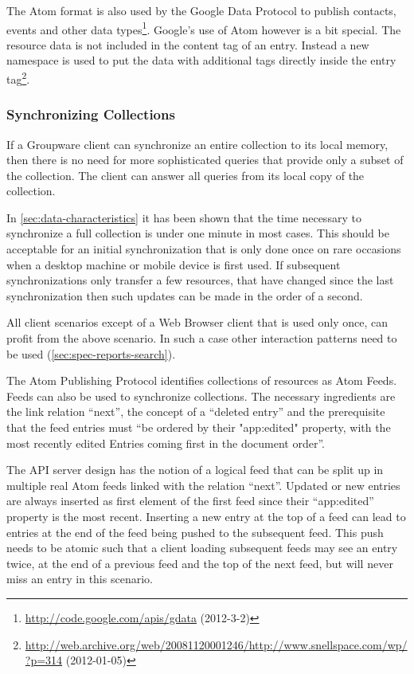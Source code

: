 \documentclass[12pt,a4paper]{scrartcl}		%
\newcommand{\citeurl}[2]{\url{#1} (#2)}
\begin{document}
The Atom format is also used by the Google Data Protocol to publish contacts,
events and other data
types\footnote{\citeurl{http://code.google.com/apis/gdata}{2012-3-2}}. Google's
use of Atom however is a bit special. The resource data is not included in the
content tag of an entry. Instead a new namespace is used to put the data with
additional tags directly inside the entry
tag\footnote{\citeurl{http://web.archive.org/web/20081120001246/http://www.snellspace.com/wp/?p=314}{2012-01-05}}.


\subsubsection{Synchronizing Collections}

If a Groupware client can synchronize an entire collection to its local memory,
then there is no need for more sophisticated queries that provide only a subset
of the collection. The client can answer all queries from its local copy of the
collection.

In \autoref{sec:data-characteristics} it has been shown that the time necessary
to synchronize a full collection is under one minute in most cases. This should
be acceptable for an initial synchronization that is only done once on rare
occasions when a desktop machine or mobile device is first used. If subsequent
synchronizations only transfer a few resources, that have changed since the last
synchronization then such updates can be made in the order of a second.

All client scenarios except of a Web Browser client that is used only once, can
profit from the above scenario. In such a case other interaction patterns need
to be used (\autoref{sec:spec-reports-search}).

The Atom Publishing Protocol identifies collections of resources as Atom
Feeds. Feeds can also be used to synchronize collections. The necessary
ingredients are the link relation ``next''\cite{RFC5005}, the concept of a
``deleted entry''\cite{draft-snell-atompub-tombstones-14} and the prerequisite
that the feed entries must ``be ordered by their "app:edited" property, with the
most recently edited Entries coming first in the document
order''\cite[sec. 10]{RFC5023}.

The API server design has the notion of a logical feed that can be split up in
multiple real Atom feeds linked with the relation ``next''. Updated or new
entries are always inserted as first element of the first feed since their
``app:edited'' property is the most recent. Inserting a new entry at the top of
a feed can lead to entries at the end of the feed being pushed to the subsequent
feed. This push needs to be atomic such that a client loading subsequent feeds
may see an entry twice, at the end of a previous feed and the top of the next
feed, but will never miss an entry in this scenario.
\end{document}
